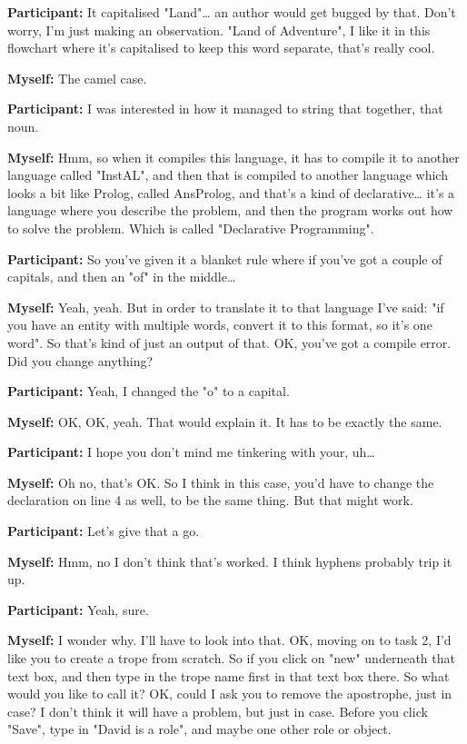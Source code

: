 \documentclass[11pt]{report}
\begin{document}
\begin{linenumbers}
\textbf{Participant:} It capitalised "Land"\ldots{} an author would get bugged by that. Don't worry, I'm just making an observation. "Land of Adventure", I like it in this flowchart where it's capitalised to keep this word separate, that's really cool.

\textbf{Myself:} The camel case.

\textbf{Participant:} I was interested in how it managed to string that together, that noun.

\textbf{Myself:} Hmm, so when it compiles this language, it has to compile it to another language called "InstAL", and then that is compiled to another language which looks a bit like Prolog, called AnsProlog, and that's a kind of declarative\ldots{} it's a language where you describe the problem, and then the program works out how to solve the problem. Which is called "Declarative Programming".

\textbf{Participant:} So you've given it a blanket rule where if you've got a couple of capitals, and then an "of" in the middle\ldots{}

\textbf{Myself:} Yeah, yeah. But in order to translate it to that language I've said: "if you have an entity with multiple words, convert it to this format, so it's one word". So that's kind of just an output of that. OK, you've got a compile error. Did you change anything?

\textbf{Participant:} Yeah, I changed the "o" to a capital.

\textbf{Myself:} OK, OK, yeah. That would explain it. It has to be exactly the same.

\textbf{Participant:} I hope you don't mind me tinkering with your, uh\ldots{}

\textbf{Myself:} Oh no, that's OK. So I think in this case, you'd have to change the declaration on line 4 as well, to be the same thing. But that might work.

\textbf{Participant:} Let's give that a go.

\textbf{Myself:} Hmm, no I don't think that's worked. I think hyphens probably trip it up.

\textbf{Participant:} Yeah, sure.

\textbf{Myself:} I wonder why. I'll have to look into that. OK, moving on to task 2, I'd like you to create a trope from scratch. So if you click on "new" underneath that text box, and then type in the trope name first in that text box there. So what would you like to call it? OK, could I ask you to remove the apostrophe, just in case? I don't think it will have a problem, but just in case. Before you click "Save", type in "David is a role", and maybe one other role or object.


\end{linenumbers}
\end{document}
